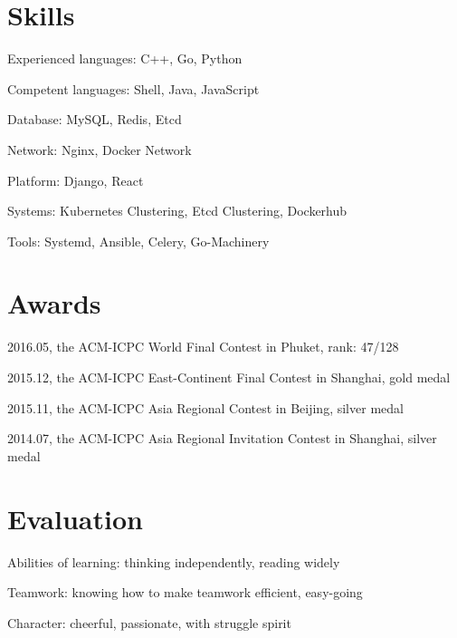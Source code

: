 \documentclass[letterpaper, 12pt]{resume}
\begin{document}
\section{Skills}
\begin{items}
    \item Experienced languages: C++, Go, Python
    \item Competent languages: Shell, Java, JavaScript
\end{items}
\endplace{}
\begin{items}
    \item Database: MySQL, Redis, Etcd
    \item Network: Nginx, Docker Network
    \item Platform: Django, React
\end{items}
\endplace{}
\begin{items}
    \item Systems: Kubernetes Clustering, Etcd Clustering, Dockerhub
    \item Tools: Systemd, Ansible, Celery, Go-Machinery
\end{items}
\endplace{}
\endsection{}

\section{Awards}
\begin{items}
    \item 2016.05, the ACM-ICPC World Final Contest in Phuket, rank: 47/128
\end{items}
\endplace{}
\begin{items}
    \item 2015.12, the ACM-ICPC East-Continent Final Contest in Shanghai, gold medal
    \item 2015.11, the ACM-ICPC Asia Regional Contest in Beijing, silver medal
    \item 2014.07, the ACM-ICPC Asia Regional Invitation Contest in Shanghai, silver medal
\end{items}
\endplace{}
\endsection{}

\section{Evaluation}
\begin{items}
    \item Abilities of learning: thinking independently, reading widely
    \item Teamwork: knowing how to make teamwork efficient, easy-going
    \item Character: cheerful, passionate, with struggle spirit
\end{items}
\endplace{}
\endsection{}
\end{document}
